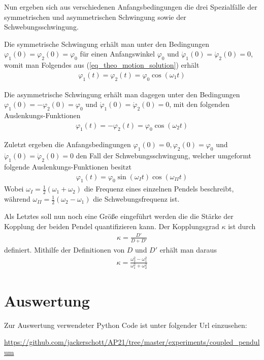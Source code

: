 \documentclass[12pt,a4paper,german]{scrartcl}
\numberwithin{equation}{section}
\begin{document}
  Nun ergeben sich aus verschiedenen Anfangsbedingungen die drei Spezialfälle der symmetrischen und asymmetrischen Schwingung sowie der Schwebungsschwingung.

  Die symmetrische Schwingung erhält man unter den Bedingungen $\varphi_1(0) = \varphi_2(0) = \varphi_0$ für einen Anfangswinkel $\varphi_0$ und $\dot{\varphi}_1(0) = \dot{\varphi}_2(0) = 0$, womit man Folgendes aus (\ref{eq_theo_motion_solution}) erhält
  \begin{align}
    \varphi_1(t) = \varphi_2(t) = \varphi_0 \cos(\omega_1 t)
    \label{eq_theo_motion_solution_sym}
  \end{align}

  Die asymmetrische Schwingung erhält man dagegen unter den Bedingungen $\varphi_1(0) = -\varphi_2(0) = \varphi_0$ und $\dot{\varphi}_1(0) = \dot{\varphi}_2(0) = 0$, mit den folgenden Auslenkungs-Funktionen
  \begin{align}
    \varphi_1(t) = -\varphi_2(t) = \varphi_0 \cos(\omega_2 t)
    \label{eq_theo_motion_solution_asym}
  \end{align}

  Zuletzt ergeben die Anfangsbedingungen $\varphi_1(0) = 0, \varphi_2(0) = \varphi_0$ und $\dot{\varphi}_1(0) = \dot{\varphi}_2(0) = 0$ den Fall der Schwebungsschwingung, welcher umgeformt folgende Auslenkungs-Funktionen besitzt
  \begin{align}
    \varphi_1(t) = \varphi_0 \sin(\omega_I t) \cos(\omega_{II} t)
    \label{eq_theo_motion_solution_beats}
  \end{align}
  Wobei $\omega_I = \frac{1}{2}(\omega_1 + \omega_2)$ die Frequenz eines einzelnen Pendels beschreibt, während $\omega_{II} = \frac{1}{2}(\omega_2 - \omega_1)$ die Schwebungsfrequenz ist.

  Als Letztes soll nun noch eine Größe eingeführt werden die die Stärke der Kopplung der beiden Pendel quantifizieren kann. Der Kopplungsgrad $\kappa$ ist durch
  \begin{align}
    \kappa = \frac{D'}{D + D'}
    \label{eq_theo_coupling_factor}
  \end{align}
  definiert. Mithilfe der Definitionen von $D$ und $D'$ erhält man daraus
  \begin{align}
    \kappa = \frac{\omega_2^2 - \omega_1^2}{\omega_1^2 + \omega_2^2}
    \label{eq_theo_coupling_factor_with_omega}
  \end{align}


  \section{Auswertung}
  Zur Auswertung verwendeter Python Code ist unter folgender Url einzusehen:
  \begin{center}
    \small
    \href{https://github.com/jackerschott/AP21/tree/master/experiments/coupled_pendulum}{https://github.com/jackerschott/AP21/tree/master/experiments/coupled\_pendulum}
  \end{center}
\end{document}
